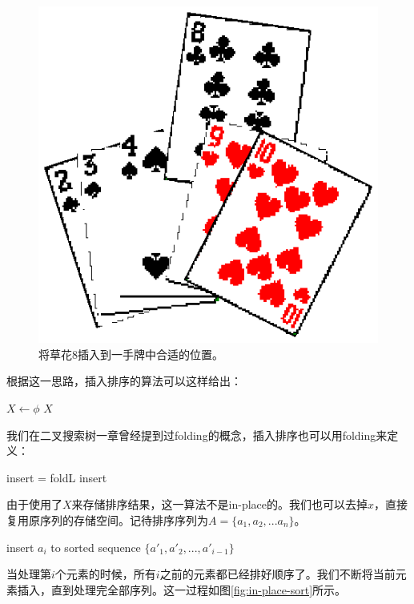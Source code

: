 \documentclass[UTF8]{article}
\begin{document}
\begin{figure}[htbp]
  \centering
  \includegraphics[scale=0.5]{img/hand-of-cards.eps}
  \caption{将草花8插入到一手牌中合适的位置。}
  \label{fig:hand-of-cards}
\end{figure}

根据这一思路，插入排序的算法可以这样给出：

\begin{algorithmic}
  \State $X \gets \phi$
    \State {}
  \EndFor
  \State \Return $X$
\EndFunction
\end{algorithmic}

我们在二叉搜索树一章曾经提到过folding的概念，插入排序也可以用folding来定义：

\be
  insert = foldL \quad insert \quad \phi
\ee

由于使用了$X$来存储排序结果，这一算法不是in-place的。我们也可以去掉$x$，直接复用原序列的存储空间。记待排序序列为$A = \{a_1, a_2, ... a_n\}$。

\begin{algorithmic}
    \State insert $a_i$ to sorted sequence $\{a'_1, a'_2, ..., a'_{i-1} \}$
  \EndFor
\EndFunction
\end{algorithmic}

当处理第$i$个元素的时候，所有$i$之前的元素都已经排好顺序了。我们不断将当前元素插入，直到处理完全部序列。这一过程如图\ref{fig:in-place-sort}所示。
\end{document}
